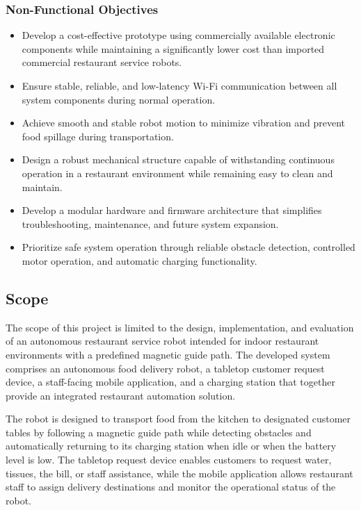 \documentclass[12pt,a4paper]{article}
\begin{document}
\subsubsection*{Non-Functional Objectives}

\begin{itemize}[nosep]
    \item Develop a cost-effective prototype using commercially
    available electronic components while maintaining a significantly
    lower cost than imported commercial restaurant service robots.

    \item Ensure stable, reliable, and low-latency Wi-Fi communication
    between all system components during normal operation.

    \item Achieve smooth and stable robot motion to minimize vibration
    and prevent food spillage during transportation.

    \item Design a robust mechanical structure capable of withstanding
    continuous operation in a restaurant environment while remaining
    easy to clean and maintain.

    \item Develop a modular hardware and firmware architecture that
    simplifies troubleshooting, maintenance, and future system
    expansion.

    \item Prioritize safe system operation through reliable obstacle
    detection, controlled motor operation, and automatic charging
    functionality.
\end{itemize}

\subsection{Scope}

The scope of this project is limited to the design, implementation,
and evaluation of an autonomous restaurant service robot intended for
indoor restaurant environments with a predefined magnetic guide path.
The developed system comprises an autonomous food delivery robot, a
tabletop customer request device, a staff-facing mobile application,
and a charging station that together provide an integrated restaurant
automation solution.

The robot is designed to transport food from the kitchen to designated
customer tables by following a magnetic guide path while detecting
obstacles and automatically returning to its charging station when
idle or when the battery level is low. The tabletop request device
enables customers to request water, tissues, the bill, or staff
assistance, while the mobile application allows restaurant staff to
assign delivery destinations and monitor the operational status of the
robot.
\end{document}
